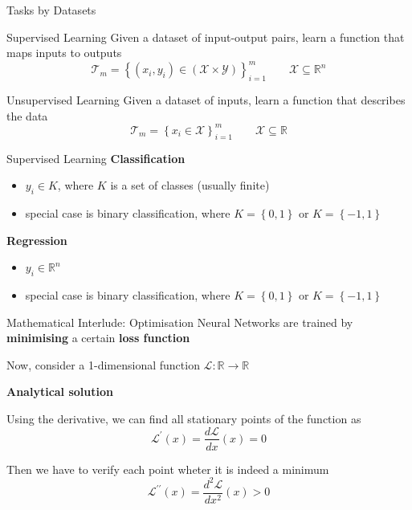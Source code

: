 \documentclass{beamer}
\begin{document}
\begin{frame}{Tasks by Datasets}
    \begin{block}{Supervised Learning}
        Given a dataset of input-output pairs, learn a function that maps inputs to outputs
        $$\mathcal{T}_m = \left\{\left(x_i, y_i\right) \in \left(\mathcal{X} \times \mathcal{Y}\right)\right\}_{i=1}^{m} \qquad \mathcal{X} \subseteq \mathbb{R}^n$$
    \end{block}
    \begin{block}{Unsupervised Learning}
        Given a dataset of inputs, learn a function that describes the data
        $$\mathcal{T}_m = \left\{x_i \in \mathcal{X}\right\}_{i=1}^{m} \qquad \mathcal{X} \subseteq \mathbb{R}$$
    \end{block}
\end{frame}

\begin{frame}{Supervised Learning}
    \textbf{Classification}
    \begin{itemize}
        \item $y_i \in K$, where $K$ is a set of classes (usually finite)
        \item special case is binary classification, where $K = \left\{0, 1\right\}$ or $K = \left\{-1, 1\right\}$
    \end{itemize}
    \vfill
    \textbf{Regression}
    \begin{itemize}
        \item $y_i \in \mathbb{R}^n$
        \item special case is binary classification, where $K = \left\{0, 1\right\}$ or $K = \left\{-1, 1\right\}$
    \end{itemize}
\end{frame}

\begin{frame}{Mathematical Interlude: Optimisation}
    Neural Networks are trained by \textbf{minimising} a certain \textbf{loss function}

    \vfill

    Now, consider a 1-dimensional function $\mathcal{L}: \mathbb{R} \rightarrow \mathbb{R}$

    \textbf{Analytical solution}

    Using the derivative, we can find all stationary points of the function as
    $$\mathcal{L}^\prime(x) = \frac{d\mathcal{L}}{dx}(x) = 0$$

    Then we have to verify each point wheter it is indeed a minimum
    $$\mathcal{L}^{\prime\prime}(x) = \frac{d^2\mathcal{L}}{dx^2}(x) > 0$$
\end{frame}
\end{document}
